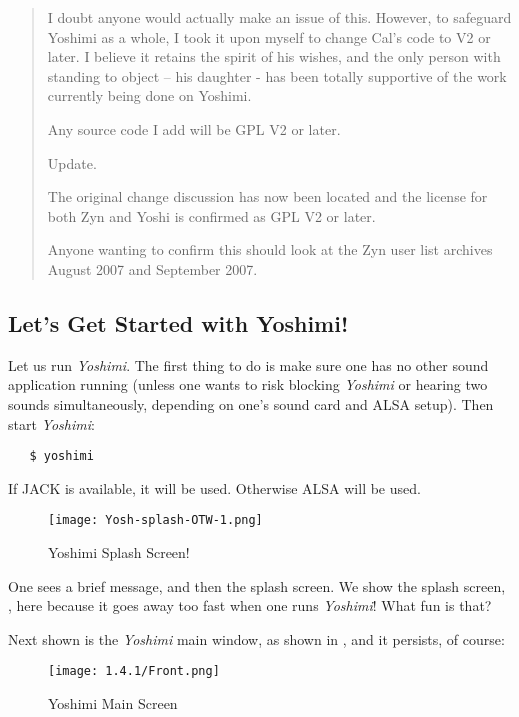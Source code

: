 \documentclass[
 11pt,
 twoside,
 a4paper,
 final                                 %
]{article}
\begin{document}
\begin{quotation}
      I doubt anyone would actually make an issue of this. However, to safeguard
      Yoshimi as a whole, I took it upon myself to change Cal's code to V2 or
      later. I believe it retains the spirit of his wishes, and the only person
      with standing to object -- his daughter - has been totally supportive of
      the work currently being done on Yoshimi.

      Any source code I add will be GPL V2 or later.

      Update.

      The original change discussion has now been located and the license for
      both Zyn and Yoshi is confirmed as GPL V2 or later.

      Anyone wanting to confirm this should look at the Zyn user list archives
      August 2007 and September 2007.
   \end{quotation}

\subsection{Let's Get Started with Yoshimi!}
\label{subsec:introduction_lets_get_started}

   Let us run \textsl{Yoshimi}.
   The first
   thing to do is make sure one has no other sound application running
   (unless one wants to risk blocking \textsl{Yoshimi} or hearing two sounds
   simultaneously, depending on one's sound card and ALSA setup).
   Then start \textsl{Yoshimi}:

\begin{verbatim}
   $ yoshimi
\end{verbatim}

   If JACK is available, it will be used.  Otherwise ALSA will be used.

\begin{figure}[H]
   \centering 
   \texttt{[image: Yosh-splash-OTW-1.png]}
   \caption{Yoshimi Splash Screen!}
   \label{fig:yoshimi_splash_screen}
\end{figure}

   One sees a brief message, and then the splash screen.
   We show the splash screen, ,
   here because it goes away too fast when one runs \textsl{Yoshimi}!
   What fun is that?

   Next shown is the \textsl{Yoshimi} main window,
   as shown in ,
   and it persists, of course:

\begin{figure}[H]
   \centering 
   \texttt{[image: 1.4.1/Front.png]}
   \caption{Yoshimi Main Screen}
   \label{fig:yoshimi_main_screen}
\end{figure}
\end{document}
